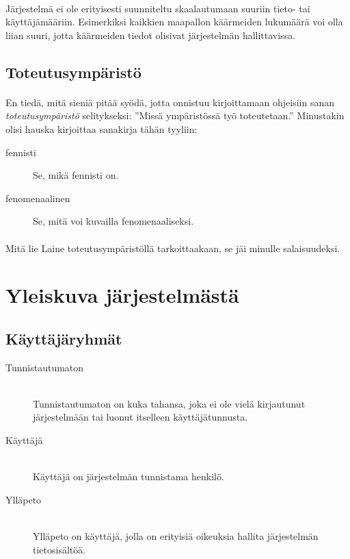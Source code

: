 \documentclass[11pt]{article}
\begin{document}
\paragraph{} Järjestelmä ei ole erityisesti suunniteltu skaalautumaan suuriin tieto- tai käyttäjämääriin. Esimerkiksi kaikkien maapallon käärmeiden lukumäärä voi olla liian suuri, jotta käärmeiden tiedot olisivat järjestelmän hallittavissa.

\subsection{Toteutusympäristö}

\paragraph{} En tiedä, mitä sieniä pitää syödä, jotta onnistuu kirjoittamaan ohjeisiin sanan \emph{toteutusympäristö} selitykseksi: ''Missä ympäristössä työ toteutetaan.'' Minustakin olisi hauska kirjoittaa sanakirja tähän tyyliin:

\begin{description}
\item[fennisti] Se, mikä fennisti on.
\item[fenomenaalinen] Se, mitä voi kuvailla fenomenaaliseksi.
\end{description}

\paragraph{} Mitä lie Laine toteutusympäristöllä tarkoittaakaan, se jäi minulle salaisuudeksi.

\section{Yleiskuva järjestelmästä}

\subsection{Käyttäjäryhmät}

\begin{description}
\item[Tunnistautumaton] \hfill \\
Tunnistautumaton on kuka tahansa, joka ei ole vielä kirjautunut järjestelmään tai luonut itselleen käyttäjätunnusta.
\item[Käyttäjä] \hfill \\
Käyttäjä on järjestelmän tunnistama henkilö.
\item[Ylläpeto] \hfill \\
Ylläpeto on käyttäjä, jolla on erityisiä oikeuksia hallita järjestelmän tietosisältöä.
\end{description}
\end{document}
